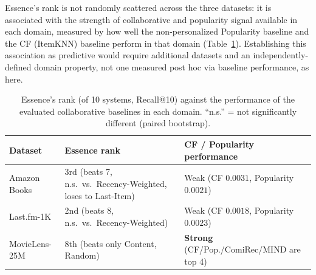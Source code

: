 \documentclass[11pt,a4paper]{article}
\begin{document}
Essence's rank is not randomly scattered across the three datasets: it is
associated with the strength of collaborative and popularity signal
available in each domain, measured by how well the non-personalized
Popularity baseline and the CF (ItemKNN) baseline perform in that domain
(Table~\ref{tab:domain-dependence}). Establishing this association as
predictive would require additional datasets and an independently-defined
domain property, not one measured post hoc via baseline performance, as
here.

\begin{table}[H]
\centering
\caption{Essence's rank (of 10 systems, Recall@10) against the performance
         of the evaluated collaborative baselines in each domain. ``n.s.''
         = not significantly different (paired bootstrap).}
\label{tab:domain-dependence}
\begin{tabular}{@{}lp{5.3cm}p{4.7cm}@{}}
\toprule
\textbf{Dataset} & \textbf{Essence rank} & \textbf{CF / Popularity performance} \\
\midrule
Amazon Books    & 3rd (beats 7, n.s.\ vs.\ Recency-Weighted, loses to Last-Item) & Weak (CF $0.0031$, Popularity $0.0021$) \\
Last.fm-1K      & 2nd (beats 8, n.s.\ vs.\ Recency-Weighted) & Weak (CF $0.0018$, Popularity $0.0023$) \\
MovieLens-25M   & 8th (beats only Content, Random) & \textbf{Strong} (CF/Pop./ComiRec/MIND are top 4) \\
\bottomrule
\end{tabular}
\end{table}
\end{document}
